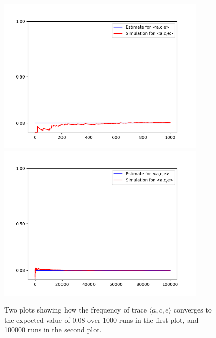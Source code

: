 \begin{figure}%
    \centering
    {{\includegraphics[width=10cm]{figures/ace1.png} }}%
    \qquad
    {{\includegraphics[width=10cm]{figures/ace100.png} }}%
    \caption{Two plots showing how the frequency of trace $\langle a,c,e \rangle$ converges to the expected value of $0.08$ over 1000 runs in the first plot, and 100000 runs in the second plot.}%
    \label{fig: ace}%
\end{figure}
%
%
%
%
%
%
